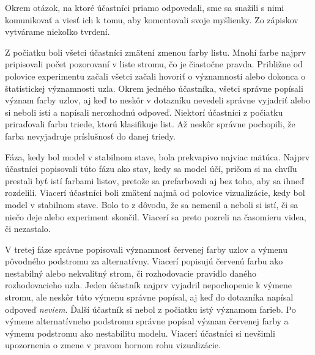 \label{fig:graph-times}
Okrem otázok, na ktoré účastníci priamo odpovedali, sme sa snažili s nimi komunikovať a viesť ich k tomu, aby komentovali svoje myšlienky. Zo zápiskov vytvárame niekoľko tvrdení.
\par
Z počiatku boli všetci účastníci zmätení zmenou farby listu. Mnohí farbe najprv pripisovali počet pozorovaní v liste stromu, čo je čiastočne pravda. Približne od polovice experimentu začali všetci začali hovoriť o významnosti alebo dokonca o štatistickej významnosti uzla. Okrem jedného účastníka, všetci správne popísali význam farby uzlov, aj keď to neskôr v dotazníku nevedeli správne vyjadriť alebo si neboli istí a napísali nerozhodnú odpoveď. Niektorí účastníci z počiatku priraďovali farbu triede, ktorú klasifikuje list. Až neskôr správne pochopili, že farba nevyjadruje príslušnosť do danej triedy.
\par
Fáza, kedy bol model v stabilnom stave, bola prekvapivo najviac mätúca. Najprv účastníci popisovali túto fázu ako stav, kedy sa model účí, pričom si na chvíľu prestali byť istí farbami listov, pretože sa prefarbovali aj bez toho, aby sa ihneď rozdelili. Viacerí účastníci boli zmätení najmä od polovice vizualizácie, kedy bol model v stabilnom stave. Bolo to z dôvodu, že sa nemenil a neboli si istí, či sa niečo deje alebo experiment skončil. Viacerí sa preto pozreli na časomieru videa, či nezastalo.
\par
V tretej fáze správne popisovali významnosť červenej farby uzlov a výmenu pôvodného podstromu za alternatívny. Viacerí popisujú červenú farbu ako nestabilný alebo nekvalitný strom, či rozhodovacie pravidlo daného rozhodovacieho uzla. Jeden účastník najprv vyjadril nepochopenie k výmene stromu, ale neskôr túto výmenu správne popísal, aj keď do dotazníka napísal odpoveď \textit{neviem}. Ďalší účastník si nebol z počiatku istý významom farieb. Po výmene alternatívneho podstromu správne popísal význam červenej farby a výmenu podstromu ako nestabilitu modelu. Viacerí účastníci si nevšimli upozornenia o zmene v pravom hornom rohu vizualizácie.
\par
